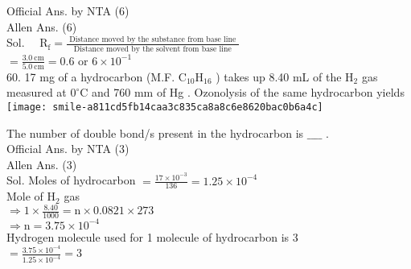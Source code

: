 \documentclass[10pt]{article}
\begin{document}
Official Ans. by NTA (6)\\
Allen Ans. (6)\\
Sol. \(\quad \mathrm{R}_{\mathrm{f}}=\frac{\text { Distance moved by the substance from base line }}{\text { Distance moved by the solvent from base line }}\)\\
\(=\frac{3.0 \mathrm{~cm}}{5.0 \mathrm{~cm}}=0.6\) or \(6 \times 10^{-1}\)\\
60. 17 mg of a hydrocarbon (M.F. \(\mathrm{C}_{10} \mathrm{H}_{16}\) ) takes up 8.40 mL of the \(\mathrm{H}_{2}\) gas measured at \(0^{\circ} \mathrm{C}\) and 760 mm of Hg . Ozonolysis of the same hydrocarbon yields\\
\texttt{[image: smile-a811cd5fb14caa3c835ca8a8c6e8620bac0b6a4c]}

The number of double bond/s present in the hydrocarbon is \(\_\_\_\_\) .\\
Official Ans. by NTA (3)\\
Allen Ans. (3)\\
Sol. Moles of hydrocarbon \(=\frac{17 \times 10^{-3}}{136}=1.25 \times 10^{-4}\)\\
Mole of \(\mathrm{H}_{2}\) gas\\
\(\Rightarrow 1 \times \frac{8.40}{1000}=\mathrm{n} \times 0.0821 \times 273\)\\
\(\Rightarrow \mathrm{n}=3.75 \times 10^{-4}\)\\
Hydrogen molecule used for 1 molecule of hydrocarbon is 3\\
\(=\frac{3.75 \times 10^{-4}}{1.25 \times 10^{-4}}=3\)
\end{document}
